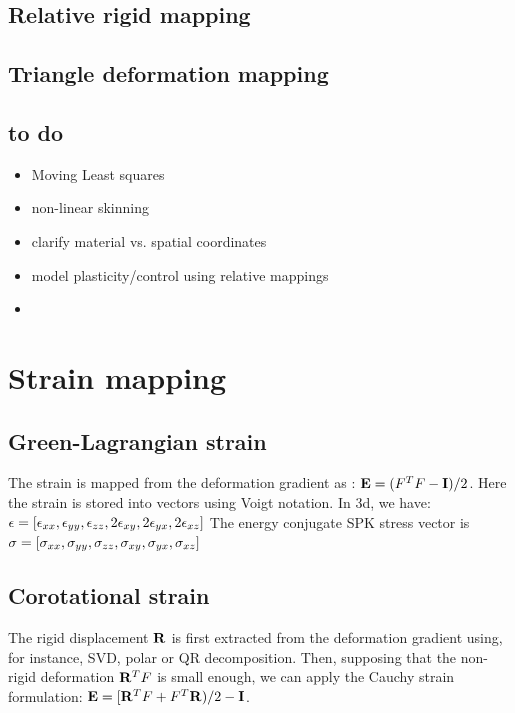 \subsection{Relative rigid mapping}

\subsection{Triangle deformation mapping}

\subsection{to do}

\begin{itemize}
 \item Moving Least squares
 \item non-linear skinning
 \item clarify material vs. spatial coordinates
 \item model plasticity/control using relative mappings
 \item 
\end{itemize}





\section{Strain mapping} \label{sec strain mapping}

\subsection{Green-Lagrangian strain}

The strain is mapped from the deformation gradient as : $\mathbf{{E}} = (F^TF - \mathbf{{I}} )/2$.
Here the strain is stored into vectors using Voigt notation. In 3d, we have: $\epsilon = [\epsilon_{xx} , \epsilon_{yy} , \epsilon_{zz} , 2\epsilon_{xy} , 2\epsilon_{yx} , 2\epsilon_{xz} ] $
The energy conjugate SPK stress vector is $\sigma = [\sigma_{xx} , \sigma_{yy} , \sigma_{zz} , \sigma_{xy} , \sigma_{yx} , \sigma_{xz} ] $

\subsection{Corotational strain}

The rigid displacement $\mathbf{{R}}$ is first extracted from the deformation gradient using, for instance, SVD, polar or QR decomposition.
Then, supposing that the non-rigid deformation $\mathbf{{R}}^T F$ is small enough, we can apply the Cauchy strain formulation:  $\mathbf{{E}} = [\mathbf{{R}}^T F + F^T \mathbf{{R}} ) /2 - \mathbf{{I}} $.


